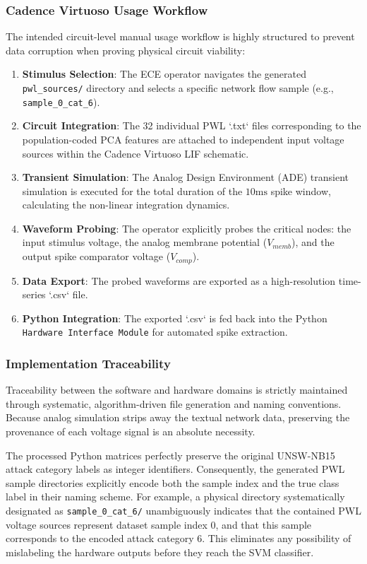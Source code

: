 \documentclass{ieeeaccess}
\begin{document}
\subsubsection{Cadence Virtuoso Usage Workflow}

The intended circuit-level manual usage workflow is highly structured to prevent data corruption when proving physical circuit viability:
\begin{enumerate}
\item \textbf{Stimulus Selection}: The ECE operator navigates the generated \texttt{pwl\_sources/} directory and selects a specific network flow sample (e.g., \texttt{sample\_0\_cat\_6}).
\item \textbf{Circuit Integration}: The 32 individual PWL `.txt` files corresponding to the population-coded PCA features are attached to independent input voltage sources within the Cadence Virtuoso LIF schematic.
\item \textbf{Transient Simulation}: The Analog Design Environment (ADE) transient simulation is executed for the total duration of the $10\text{ms}$ spike window, calculating the non-linear integration dynamics.
\item \textbf{Waveform Probing}: The operator explicitly probes the critical nodes: the input stimulus voltage, the analog membrane potential ($V_{memb}$), and the output spike comparator voltage ($V_{comp}$).
\item \textbf{Data Export}: The probed waveforms are exported as a high-resolution time-series `.csv` file.
\item \textbf{Python Integration}: The exported `.csv` is fed back into the Python \texttt{Hardware Interface Module} for automated spike extraction.
\end{enumerate}

\subsubsection{Implementation Traceability}

Traceability between the software and hardware domains is strictly maintained through systematic, algorithm-driven file generation and naming conventions. Because analog simulation strips away the textual network data, preserving the provenance of each voltage signal is an absolute necessity.

The processed Python matrices perfectly preserve the original UNSW-NB15 attack category labels as integer identifiers. Consequently, the generated PWL sample directories explicitly encode both the sample index and the true class label in their naming scheme. For example, a physical directory systematically designated as \texttt{sample\_0\_cat\_6/} unambiguously indicates that the contained PWL voltage sources represent dataset sample index 0, and that this sample corresponds to the encoded attack category 6. This eliminates any possibility of mislabeling the hardware outputs before they reach the SVM classifier.
\end{document}
